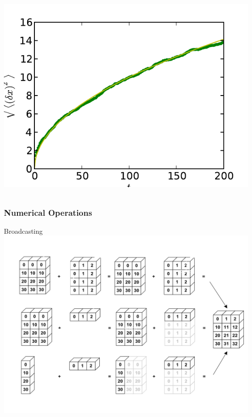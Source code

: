 \documentclass[colorlinks]{beamer}
\begin{document}
\begin{frame}[fragile]\frametitle{}
\begin{columns}[c]

\includegraphics[width=\textwidth]{plwfigis/CursP_2_figure8}


\end{columns}
\end{frame}


\begin{frame}[fragile]\frametitle{Numerical Operations}
\begin{block}{Broadcasting}
\includegraphics[scale=0.25]{figs/numpy_broadcasting}

\end{block}

\end{frame}
\end{document}

